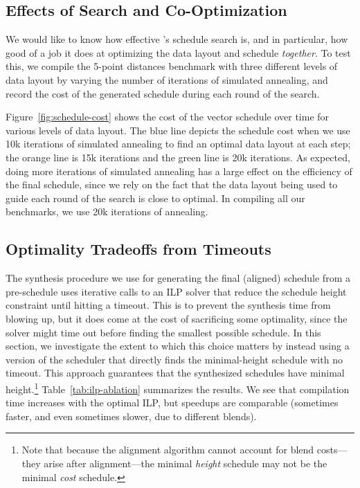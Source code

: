 \subsection{Effects of Search and Co-Optimization}\label{sec:search-and-cooptimization}
We would like to know how effective {\system}'s schedule search is, and in particular, how good of a job it does at optimizing the data layout and schedule {\em together}.
To test this, we compile the 5-point distances benchmark with three different levels of data layout by varying the number of iterations of simulated annealing, and record the cost of the generated schedule during each round of the search.

Figure~{\ref{fig:schedule-cost}} shows the cost of the vector schedule over time for various levels of data layout.
The blue line depicts the schedule cost when we use 10k iterations of simulated annealing to find an optimal data layout at each step; the orange line is 15k iterations and the green line is 20k iterations.
As expected, doing more iterations of simulated annealing has a large effect on the efficiency of the final schedule, since we rely on the fact that the data layout being used to guide each round of the search is close to optimal.
In compiling all our benchmarks, we use 20k iterations of annealing.

\subsection{Optimality Tradeoffs from Timeouts}\label{sec:ilp-ablation}
The synthesis procedure we use for generating the final (aligned) schedule from a pre-schedule uses iterative calls to an ILP solver that reduce the schedule height constraint until hitting a timeout.
This is to prevent the synthesis time from blowing up, but it does come at the cost of sacrificing some optimality, since the solver might time out before finding the smallest possible schedule. 
In this section, we investigate the extent to which this choice matters by instead using a version of the scheduler that directly finds the minimal-height schedule with no timeout. This approach guarantees that the synthesized schedules have minimal height.\footnote{Note that because the alignment algorithm cannot account for blend costs---they arise after alignment---the minimal {\em height} schedule may not be the minimal {\em cost} schedule.} Table~{\ref{tab:ilp-ablation}} summarizes the results. We see that compilation time increases with the optimal ILP, but speedups are comparable (sometimes faster, and even sometimes slower, due to different blends).

